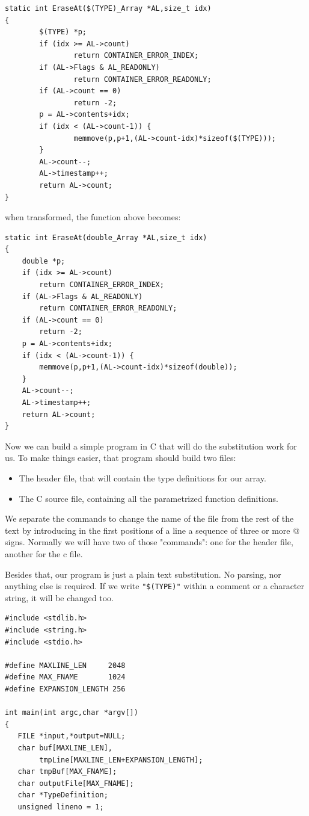 \documentclass[12pt,a4paper,openany]{memoir} %
\begin{document}
{{\begin{verbatim}
static int EraseAt($(TYPE)_Array *AL,size_t idx)
{
        $(TYPE) *p;
        if (idx >= AL->count)
                return CONTAINER_ERROR_INDEX;
        if (AL->Flags & AL_READONLY)
                return CONTAINER_ERROR_READONLY;
        if (AL->count == 0)
                return -2;
        p = AL->contents+idx;
        if (idx < (AL->count-1)) {
                memmove(p,p+1,(AL->count-idx)*sizeof($(TYPE)));
        }
        AL->count--;
        AL->timestamp++;
        return AL->count;
}
\end{verbatim}

when transformed, the function above becomes:

\begin{verbatim}
static int EraseAt(double_Array *AL,size_t idx)
{
    double *p;
    if (idx >= AL->count)
        return CONTAINER_ERROR_INDEX;
    if (AL->Flags & AL_READONLY)
        return CONTAINER_ERROR_READONLY;
    if (AL->count == 0)
        return -2;
    p = AL->contents+idx;
    if (idx < (AL->count-1)) {
        memmove(p,p+1,(AL->count-idx)*sizeof(double));
    }
    AL->count--;
    AL->timestamp++;
    return AL->count;
}
\end{verbatim}

Now we can build a simple program in C that will do the substitution work for us. To make things easier, that program should build two files:
\begin{itemize}
\item The header file, that will contain the type definitions for our array.
\item The C source file, containing all the parametrized function definitions.
\end{itemize}
We separate the commands to change the name of the file from the rest of the text by introducing in the first positions of a line a sequence of three or more @ signs.  Normally we will have two of those "commands": one for the header file, another for the c file.

Besides that, our program is just a plain text substitution. No parsing, nor anything else is required. If we write \texttt{"\$(TYPE)"} within a comment or a character string, it will be changed too.
\begin{verbatim}
#include <stdlib.h>
#include <string.h>
#include <stdio.h>

#define MAXLINE_LEN     2048
#define MAX_FNAME       1024
#define EXPANSION_LENGTH 256

int main(int argc,char *argv[])
{
   FILE *input,*output=NULL;
   char buf[MAXLINE_LEN],
        tmpLine[MAXLINE_LEN+EXPANSION_LENGTH];
   char tmpBuf[MAX_FNAME];
   char outputFile[MAX_FNAME];
   char *TypeDefinition;
   unsigned lineno = 1;


\end{verbatim}}}
\end{document}
